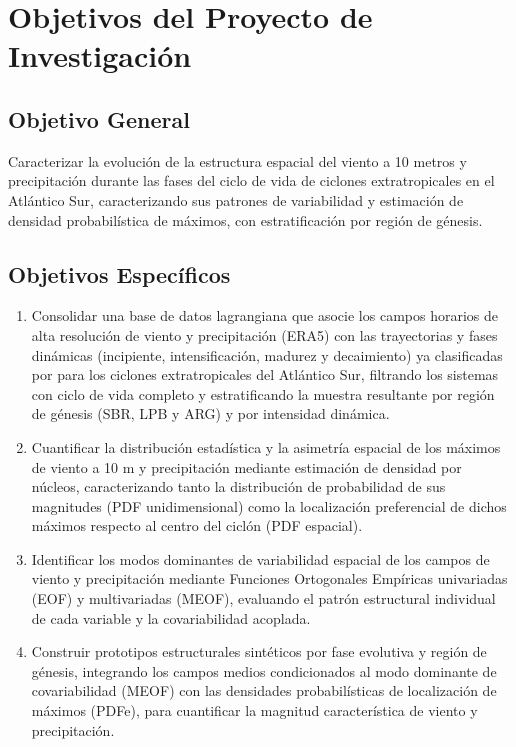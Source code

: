 
\section{Objetivos del Proyecto de Investigación}

\subsection{Objetivo General}
Caracterizar la evolución de la estructura espacial del viento a 10 metros y precipitación durante las fases del ciclo de vida de ciclones extratropicales en el Atlántico Sur, caracterizando sus patrones de variabilidad y estimación de densidad probabilística de máximos, con estratificación por región de génesis.

\subsection{Objetivos Específicos}
\begin{enumerate}
    \item Consolidar una base de datos lagrangiana que asocie los campos horarios de alta resolución de viento y precipitación (ERA5) con las trayectorias y fases dinámicas (incipiente, intensificación, madurez y decaimiento) ya clasificadas por \citet{coutodesouza2024new} para los ciclones extratropicales del Atlántico Sur, filtrando los sistemas con ciclo de vida completo y estratificando la muestra resultante por región de génesis (SBR, LPB y ARG) y por intensidad dinámica.
    
    \item Cuantificar la distribución estadística y la asimetría espacial de los máximos de viento a 10 m y precipitación mediante estimación de densidad por núcleos, caracterizando tanto la distribución de probabilidad de sus magnitudes (PDF unidimensional) como la localización preferencial de dichos máximos respecto al centro del ciclón (PDF espacial).
    
    \item Identificar los modos dominantes de variabilidad espacial de los campos de viento y precipitación mediante Funciones Ortogonales Empíricas univariadas (EOF) y multivariadas (MEOF), evaluando el patrón estructural individual de cada variable y la covariabilidad acoplada.
    
    \item Construir prototipos estructurales sintéticos por fase evolutiva y región de génesis, integrando los campos medios condicionados al modo dominante de covariabilidad (MEOF) con las densidades probabilísticas de localización de máximos (PDFe), para cuantificar la magnitud característica de viento y precipitación.
\end{enumerate}
